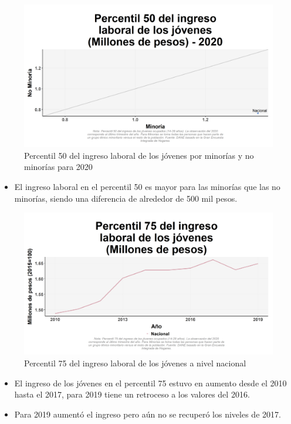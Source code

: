     \begin{figure}[H]
        \caption{Percentil 50 del ingreso laboral de los jóvenes por minorías y no minorías para 2020 \label{map_result_2} }
        \begin{center}
        \includegraphics[width=\textwidth,keepaspectratio]{img/var_21_scatter.png}
        \end{center}
    \end{figure}
            \begin{itemize}
                \item El ingreso laboral en el percentil 50 es mayor para las minorías que las no minorías, siendo una diferencia de alrededor de 500 mil pesos.
                \end{itemize}

    \begin{figure}[H]
        \caption{Percentil 75 del ingreso laboral de los jóvenes a nivel nacional \label{map_result_2} }
        \begin{center}
        \includegraphics[width=\textwidth,keepaspectratio]{img/var_33_trend.png}
        \end{center}
    \end{figure}
            \begin{itemize}
                \item El ingreso de los jóvenes en el percentil 75 estuvo en aumento desde el 2010 hasta el 2017, para 2019 tiene un retroceso a los valores del 2016.
                \item Para 2019 aumentó el ingreso pero aún no se recuperó los niveles de 2017.
                \end{itemize}

